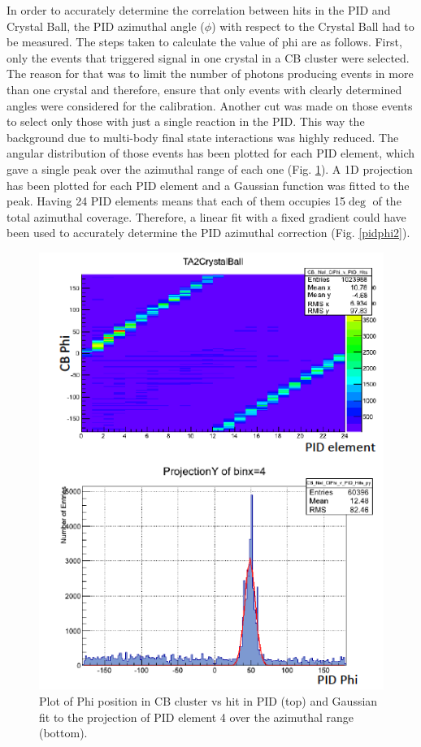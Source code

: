 \indent In order to accurately determine the correlation between hits in the PID and Crystal Ball, the PID azimuthal angle ($\phi$) with respect to the Crystal Ball had to be measured. The steps taken to calculate the value of phi are as follows.
\indent First, only the events that triggered signal in one crystal in a CB cluster were selected. The reason for that was to limit the number of photons producing events in more than one crystal and therefore, ensure that only events with clearly determined angles were considered for the calibration. Another cut was made on those events to select only those with just a single reaction in the PID. This way the background due to multi-body final state interactions was highly reduced.
\indent The angular distribution of those events has been plotted for each PID element, which gave a single peak over the azimuthal range of each one (Fig. \ref{pidphi}). A 1D projection has been plotted for each PID element and a Gaussian function was fitted to the peak. Having 24 PID elements means that each of them occupies 15$\deg$ of the total azimuthal coverage. Therefore, a linear fit with a fixed gradient could have been used to accurately determine the PID azimuthal correction (Fig. \ref{pidphi2}).

\begin{figure}[H]
\begin{center}
\includegraphics[scale=0.55]{pictures/png/pidphi.png}
\caption{Plot of Phi position in CB cluster vs hit in PID (top) and Gaussian fit to the projection of PID element 4 over the azimuthal range (bottom).}
\label{pidphi}
\end{center}
\end{figure}

